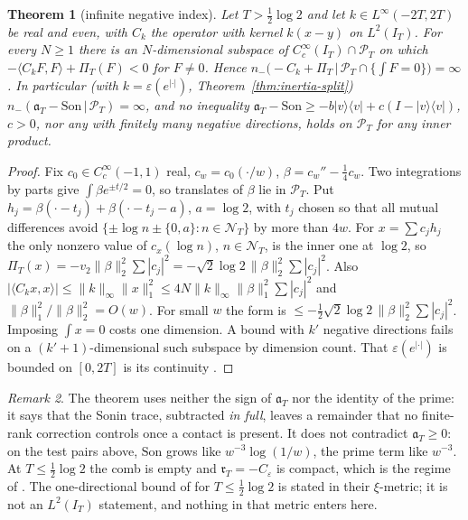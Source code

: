 \documentclass[11pt]{amsart}
\newtheorem{theorem}{Theorem}[section]
\theoremstyle{definition}
\theoremstyle{remark}
\newtheorem{remark}[theorem]{Remark}
\newcommand{\PT}{\mathcal P_T}
\newcommand{\IT}{I_T}
\newcommand{\NT}{\mathcal N_T}
\newcommand{\PiT}{\Pi_T}
\begin{document}
\begin{theorem}[infinite negative index]\label{thm:inertia-nogo}
Let $T>\frac12\log2$ and let $k\in L^\infty(-2T,2T)$ be real and even, with $C_k$ the operator with kernel
$k(x-y)$ on $L^2(\IT)$. For every $N\ge1$ there is an $N$-dimensional subspace of
$C_c^\infty(\IT)\cap\PT$ on which $-\langle C_kF,F\rangle+\PiT(F)<0$ for $F\ne0$. Hence
$n_-\big(-C_k+\PiT\,\big|\,\PT\cap\{\int F=0\}\big)=\infty$. In particular (with $k=\varepsilon(e^{|\cdot|})$,
Theorem~\ref{thm:inertia-split}) $n_-(\mathfrak a_T-\mathrm{Son}\,|\,\PT)=\infty$, and no inequality
$\mathfrak a_T-\mathrm{Son}\ge-b|v\rangle\langle v|+c(I-|v\rangle\langle v|)$, $c>0$, nor any with finitely many
negative directions, holds on $\PT$ for any inner product.
\end{theorem}
\begin{proof}
Fix $c_0\in C_c^\infty(-1,1)$ real, $c_w=c_0(\cdot/w)$, $\beta=c_w''-\frac14c_w$. Two
integrations by parts give $\int\beta e^{\pm t/2}=0$, so translates of $\beta$ lie in $\PT$. Put
$h_j=\beta(\cdot-t_j)+\beta(\cdot-t_j-a)$, $a=\log2$, with $t_j$ chosen so that all mutual differences avoid
$\{\pm\log n\pm\{0,a\}:n\in\NT\}$ by more than $4w$. For $x=\sum c_jh_j$ the only nonzero value of $c_x(\log n)$,
$n\in\NT$, is the inner one at $\log2$, so $\PiT(x)=-v_2\|\beta\|_2^2\sum|c_j|^2=-\sqrt2\log2\,\|\beta\|_2^2\sum|c_j|^2$.
Also $|\langle C_kx,x\rangle|\le\|k\|_\infty\|x\|_1^2\le4N\|k\|_\infty\|\beta\|_1^2\sum|c_j|^2$ and
$\|\beta\|_1^2/\|\beta\|_2^2=O(w)$. For small $w$ the form is $\le-\frac12\sqrt2\log2\,\|\beta\|_2^2\sum|c_j|^2$.
Imposing $\int x=0$ costs one dimension. A bound with $k'$ negative directions fails on a $(k'+1)$-dimensional
such subspace by dimension count. That $\varepsilon(e^{|\cdot|})$ is bounded on $[0,2T]$ is its continuity
\cite[(84)]{ConnesConsani2021}.
\end{proof}
\begin{remark}
The theorem uses neither the sign of $\mathfrak a_T$ nor the identity of the prime: it says that the Sonin
trace, subtracted \emph{in full}, leaves a remainder that no finite-rank correction controls once a contact is
present. It does not contradict $\mathfrak a_T\ge0$: on the test pairs above,
$\mathrm{Son}$ grows like $w^{-3}\log(1/w)$, the prime term like $w^{-3}$. At $T\le\frac12\log2$ the comb is
empty and $\mathfrak r_T=-C_\varepsilon$ is compact, which is the regime of \cite[\S6]{ConnesConsani2021}.
The one-directional bound of \cite[\S5]{ConnesConsani2021} for $T\le\frac12\log2$ is stated in their
$\xi$-metric; it is not an $L^2(\IT)$ statement, and nothing in that metric enters here.
\end{remark}
\end{document}

